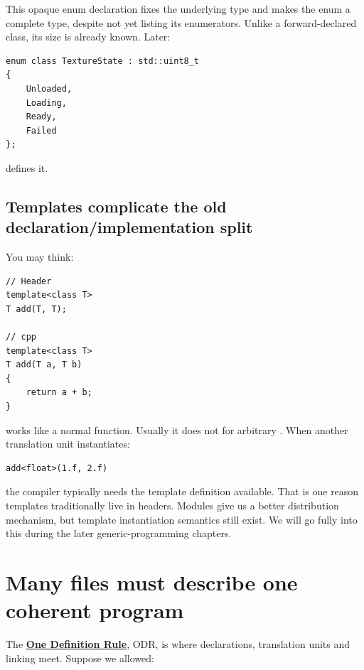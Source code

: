 This opaque enum declaration fixes the underlying type and makes the enum a complete type, despite not yet listing its enumerators. Unlike a forward-declared class, its size is already known. Later:

\begin{verbatim}
enum class TextureState : std::uint8_t
{
    Unloaded,
    Loading,
    Ready,
    Failed
};
\end{verbatim}

defines it.

\subsection{Templates complicate the old declaration/implementation split}\label{01-foundations-i-ch002-templates-complicate-the-old-declarationimplementation-split}

\hypertarget{01-foundations-i-ch002-templates-complicate-the-old-declarationimplementation-split}{}

You may think:

\begin{verbatim}
// Header
template<class T>
T add(T, T);

// cpp
template<class T>
T add(T a, T b)
{
    return a + b;
}
\end{verbatim}

works like a normal function. Usually it does not for arbitrary . When another translation unit instantiates:

\begin{verbatim}
add<float>(1.f, 2.f)
\end{verbatim}

the compiler typically needs the template definition available. That is one reason templates traditionally live in headers. Modules give us a better distribution mechanism, but template instantiation semantics still exist. We will go fully into this during the later generic-programming chapters.

\section{Many files must describe one coherent program}\label{01-foundations-i-ch002-many-files-must-describe-one-coherent-program}

\hypertarget{01-foundations-i-ch002-many-files-must-describe-one-coherent-program}{}

The \textbf{\hyperref[appendix-49d27bc9d9a5]{One Definition Rule}}, ODR, is where declarations, translation units and linking meet. Suppose we allowed:

